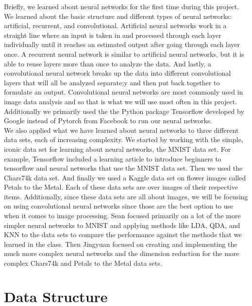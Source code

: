 \documentclass{article}
\begin{document}
\begin{multicols}{2}

Briefly, we learned about neural networks for the first time during this project. We learned about the basic structure and different types of neural networks: artificial, recurrent, and convolutional. Artificial neural networks work in a straight line where an input is taken in and processed through each layer individually until it reaches an estimated output after going through each layer once. A recurrent neural network is similar to artificial neural networks, but it is able to reuse layers more than once to analyze the data. And lastly, a convolutional neural network breaks up the data into different convolutional layers that will all be analyzed separate;y and then put back together to formulate an output. Convolutional neural networks are most commonly used in image data analysis and so that is what we will use most often in this project. Additionally we primarily used the the Python package Tensorflow developed by Google instead of Pytorch from Facebook to run our neural networks.\\
We also applied what we have learned about neural networks to three different data sets, each of increasing complexity. We started by working with the simple, iconic data set for learning about neural networks, the MNIST data set. For example, Tensorflow included a learning article to introduce beginners to tensorflow and neural networks that use the MNIST data set. Then we used the Chars74k data set. And finally we used a Kaggle data set on flower images called Petals to the Metal. Each of these data sets are over images of their respective items. Additionally, since these data sets are all about images, we will be focusing on using convolutional neural networks since those are the best option to use when it comes to image processing. Sean focused primarily on a lot of the more simpler neural networks to MNIST and applying methods like LDA, QDA, and KNN to the data sets to compare the performance against the methods that we learned in the class. Then Jingyuan focused on creating and implementing the much more complex neural networks and the dimension reduction for the more complex Chars74k and Petals to the Metal data sets.

\section*{Data Structure}


\end{multicols}
\end{document}
